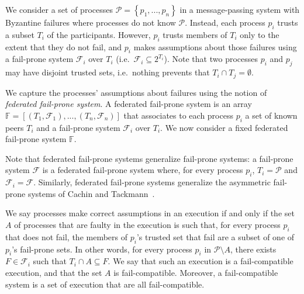 \documentclass[11pt,letterpaper]{article}
\begin{document}
We consider a set of processes $\mathcal{P}=\left\{p_1,...,p_n\right\}$ in a message-passing system with Byzantine failures where processes do not know $\mathcal{P}$.
Instead, each process $p_i$ trusts a subset $T_i$ of the participants.
However, $p_i$ trusts members of $T_i$ only to the extent that they do not fail, and $p_i$ makes assumptions about those failures using a fail-prone system $\mathcal{F}_i$ over $T_i$ (i.e.\ $\mathcal{F}_i\subseteq 2^{T_i}$).
Note that two processes $p_i$ and $p_j$ may have disjoint trusted sets, i.e.\ nothing prevents that $T_i\cap T_j=\emptyset$.


We capture the processes' assumptions about failures using the notion of \emph{federated fail-prone system}.
A federated fail-prone system is an array $\mathbb{F}=\left[\left(T_1,\mathcal{F}_1\right),...,\left(T_n,\mathcal{F}_n\right)\right]$ that associates to each process $p_i$ a set of known peers $T_i$ and a fail-prone system $\mathcal{F}_i$ over $T_i$.
We now consider a fixed federated fail-prone system $\mathbb{F}$.

Note that federated fail-prone systems generalize fail-prone systems: a fail-prone system $\mathcal{F}$ is a federated fail-prone system where, for every process $p_i$, $T_i=\mathcal{P}$ and $\mathcal{F}_i=\mathcal{F}$. Similarly, federated fail-prone systems generalize the asymmetric fail-prone systems of Cachin and Tackmann~\cite{cachinAsymmetricDistributedTrust2019}.

We say processes make correct assumptions in an execution if and only if the set $A$ of processes that are faulty in the execution is such that, for every process $p_i$ that does not fail, the members of $p_i$'s trusted set that fail are a subset of one of $p_i$'s fail-prone sets.
In other words, for every process $p_i$ in $\mathcal{P}\setminus A$, there exists $F\in\mathcal{F}_i$ such that $T_i\cap A \subseteq F$.
We say that such an execution is a fail-compatible execution, and that the set $A$ is fail-compatible.
Moreover, a fail-compatible system is a set of execution that are all fail-compatible.
\end{document}
